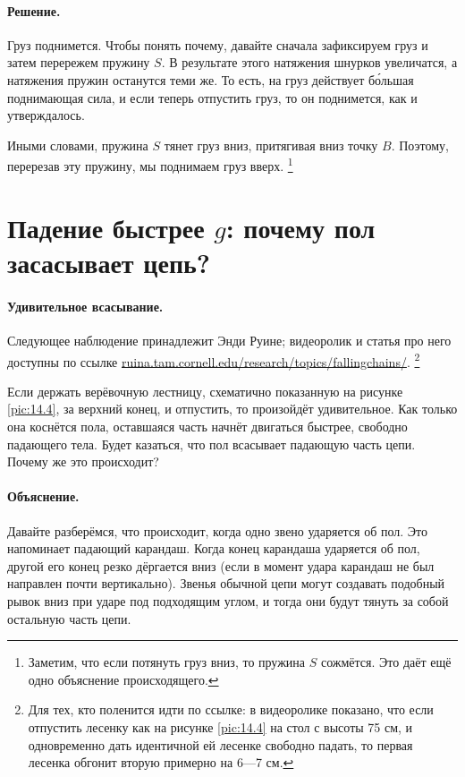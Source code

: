 \paragraph{Решение.}
Груз поднимется.
Чтобы понять почему, давайте сначала зафиксируем груз и затем перережем пружину $S$.
В результате этого натяжения шнурков увеличатся, а натяжения пружин останутся теми же.
То есть, на груз действует б\'{о}льшая поднимающая сила, и если теперь отпустить груз, то он поднимется, как и утверждалось.

Иными словами, пружина $S$ тянет груз вниз, притягивая вниз точку $B$.
Поэтому, перерезав эту пружину, мы поднимаем груз вверх.%
\footnote{Заметим, что если потянуть груз вниз, то пружина $S$ сожмётся.
Это даёт ещё одно объяснение происходящего. \pr}

\section{Падение быстрее $g$: почему пол засасывает цепь?}

\paragraph{Удивительное всасывание.}
Следующее наблюдение принадлежит Энди Руине;
видеоролик и статья про него доступны по ссылке
\href{http://ruina.tam.cornell.edu/research/topics/fallingchains/}{ruina.tam.cornell.edu/research/topics/fallingchains/}.%
\footnote{Для тех, кто поленится идти по ссылке: в видеоролике показано, что если отпустить лесенку как на рисунке \ref{pic:14.4} на стол с высоты 75 см, и одновременно дать идентичной ей лесенке свободно падать, то первая лесенка обгонит вторую примерно на 6---7 см.\pr}

Если держать верёвочную лестницу, схематично показанную на рисунке \ref{pic:14.4}, за верхний конец, и отпустить, то произойдёт удивительное.
Как только она коснётся пола, оставшаяся часть начнёт двигаться быстрее, свободно падающего тела.
Будет казаться, что пол всасывает падающую часть цепи.
Почему же это происходит?

\paragraph{Объяснение.}
Давайте разберёмся, что происходит, когда одно звено ударяется об пол.
Это напоминает падающий карандаш.
Когда конец карандаша ударяется об пол, другой его конец резко дёргается вниз (если в момент удара  карандаш не был направлен почти вертикально).
Звенья обычной цепи могут создавать подобный рывок вниз при ударе под подходящим углом, и тогда они будут тянуть за собой остальную часть цепи.


